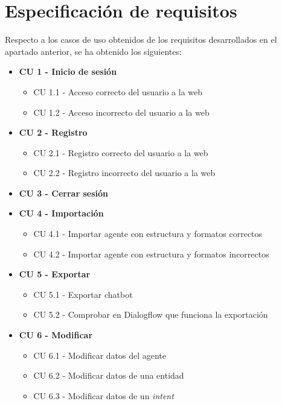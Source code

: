 \section{Especificación de requisitos}
Respecto a los casos de uso obtenidos de los requisitos desarrollados en el apartado anterior, se ha obtenido los siguientes:
\begin{itemize}
    \item \textbf{CU 1 - Inicio de sesión}
    \begin{itemize}
        \item CU 1.1 - Acceso correcto del usuario a la web
        \item CU 1.2 - Acceso incorrecto del usuario a la web
    \end{itemize}

    \item \textbf{CU 2 - Registro}
    \begin{itemize}
        \item CU 2.1 - Registro correcto del usuario a la web
        \item CU 2.2 - Registro incorrecto del usuario a la web
    \end{itemize}

    \item \textbf{CU 3 - Cerrar sesión}

    \item \textbf{CU 4 - Importación}
    \begin{itemize}
        \item CU 4.1 - Importar agente con estructura y formatos correctos
        \item CU 4.2 - Importar agente con estructura y formatos incorrectos
    \end{itemize}

    \item \textbf{CU 5 - Exportar}
    \begin{itemize}
        \item CU 5.1 - Exportar chatbot
        \item CU 5.2 - Comprobar en Dialogflow que funciona la exportación
    \end{itemize}

    \item \textbf{CU 6 - Modificar}
    \begin{itemize}
        \item CU 6.1 - Modificar datos del agente
        \item CU 6.2 - Modificar datos de una entidad
        \item CU 6.3 - Modificar datos de un \textit{intent}
    \end{itemize}


\end{itemize}
